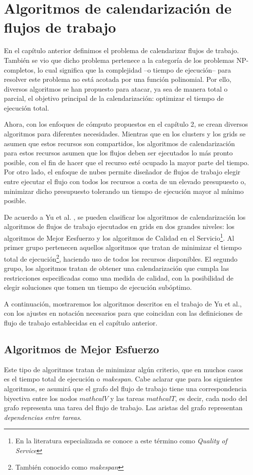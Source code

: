 \chapter{Algoritmos de calendarización de flujos de trabajo}
En el capítulo anterior definimos el problema de calendarizar flujos de trabajo. También se vio que dicho problema pertenece a la categoría de los problemas NP-completos, lo cual significa que la complejidad --o tiempo de ejecución-- para resolver este problema no está acotada por una función polinomial. Por ello, diversos algoritmos se han propuesto para atacar, ya sea de manera total o parcial, el objetivo principal de la calendarización: optimizar el tiempo de ejecución total.

Ahora, con los enfoques de cómputo propuestos en el capítulo 2, se crean diversos algoritmos para diferentes necesidades. Mientras que en los clusters y los grids se asumen que estos recursos son compartidos, los algoritmos de calendarización para estos recursos asumen que los flujos deben ser ejecutados lo más pronto posible, con el fin de hacer que el recurso esté ocupado la mayor parte del tiempo. Por otro lado, el enfoque de nubes permite diseñador de flujos de trabajo elegir entre ejecutar el flujo con todos los recursos a costa de un elevado presupuesto o, minimizar dicho presupuesto tolerando un tiempo de ejecución mayor al mínimo posible.

De acuerdo a Yu et al. \cite{yu2008workflow}, se pueden clasificar los algoritmos de calendarización los algoritmos de flujos de trabajo ejecutados en grids en dos grandes niveles: los algoritmos de Mejor Eesfuerzo y los algoritmos de Calidad en el Servicio\footnote{En la literatura especializada se conoce a este término como \emph{Quality of Service}}. Al primer grupo pertenecen aquellos algoritmos que tratan de minimizar el tiempo total de ejecución\footnote{También conocido como \emph{makespan}}, haciendo uso de todos los recursos disponibles. El segundo grupo, los algoritmos tratan de obtener una calendarización que cumpla las restricciones especificadas como una medida de calidad, con la posibilidad de elegir soluciones que tomen un tiempo de ejecución subóptimo.

A continuación, mostraremos los algoritmos descritos en el trabajo de Yu et al., con los ajustes en notación necesarios para que coincidan con las definiciones de flujo de trabajo establecidas en el capítulo anterior.


\section{Algoritmos de Mejor Esfuerzo}
Este tipo de algoritmos tratan de minimizar algún criterio, que en muchos casos es el tiempo total de ejecución o \emph{makespan}. Cabe aclarar que para los siguientes algoritmos, se asumirá que el grafo del flujo de trabajo tiene una correspondencia biyectiva entre los nodos $mathcal{V}$ y las tareas $mathcal{T}$, es decir, cada nodo del grafo representa una tarea del flujo de trabajo. Las aristas del grafo representan \emph{dependencias entre tareas}.

